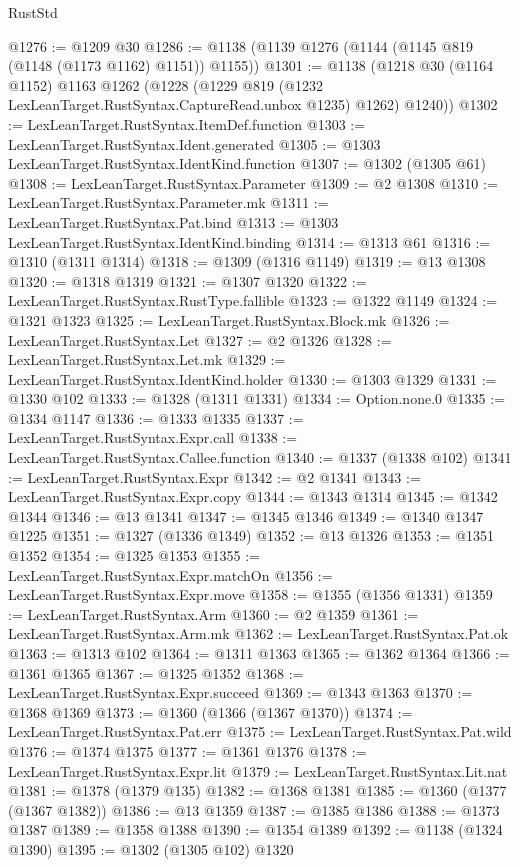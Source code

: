 \begin{lexlean}{RustStd}
\begin{coremodule}
@1276 := @1209 @30
@1286 := @1138 (@1139 @1276 (@1144 (@1145 @819 (@1148 (@1173 @1162) @1151)) @1155))
@1301 := @1138
    (@1218
      @30
      (@1164 @1152)
      @1163
      @1262
      (@1228 (@1229 @819 (@1232 LexLeanTarget.RustSyntax.CaptureRead.unbox @1235) @1262) @1240))
@1302 := LexLeanTarget.RustSyntax.ItemDef.function
@1303 := LexLeanTarget.RustSyntax.Ident.generated
@1305 := @1303 LexLeanTarget.RustSyntax.IdentKind.function
@1307 := @1302 (@1305 @61)
@1308 := LexLeanTarget.RustSyntax.Parameter
@1309 := @2 @1308
@1310 := LexLeanTarget.RustSyntax.Parameter.mk
@1311 := LexLeanTarget.RustSyntax.Pat.bind
@1313 := @1303 LexLeanTarget.RustSyntax.IdentKind.binding
@1314 := @1313 @61
@1316 := @1310 (@1311 @1314)
@1318 := @1309 (@1316 @1149)
@1319 := @13 @1308
@1320 := @1318 @1319
@1321 := @1307 @1320
@1322 := LexLeanTarget.RustSyntax.RustType.fallible
@1323 := @1322 @1149
@1324 := @1321 @1323
@1325 := LexLeanTarget.RustSyntax.Block.mk
@1326 := LexLeanTarget.RustSyntax.Let
@1327 := @2 @1326
@1328 := LexLeanTarget.RustSyntax.Let.mk
@1329 := LexLeanTarget.RustSyntax.IdentKind.holder
@1330 := @1303 @1329
@1331 := @1330 @102
@1333 := @1328 (@1311 @1331)
@1334 := Option.none.{0}
@1335 := @1334 @1147
@1336 := @1333 @1335
@1337 := LexLeanTarget.RustSyntax.Expr.call
@1338 := LexLeanTarget.RustSyntax.Callee.function
@1340 := @1337 (@1338 @102)
@1341 := LexLeanTarget.RustSyntax.Expr
@1342 := @2 @1341
@1343 := LexLeanTarget.RustSyntax.Expr.copy
@1344 := @1343 @1314
@1345 := @1342 @1344
@1346 := @13 @1341
@1347 := @1345 @1346
@1349 := @1340 @1347 @1225
@1351 := @1327 (@1336 @1349)
@1352 := @13 @1326
@1353 := @1351 @1352
@1354 := @1325 @1353
@1355 := LexLeanTarget.RustSyntax.Expr.matchOn
@1356 := LexLeanTarget.RustSyntax.Expr.move
@1358 := @1355 (@1356 @1331)
@1359 := LexLeanTarget.RustSyntax.Arm
@1360 := @2 @1359
@1361 := LexLeanTarget.RustSyntax.Arm.mk
@1362 := LexLeanTarget.RustSyntax.Pat.ok
@1363 := @1313 @102
@1364 := @1311 @1363
@1365 := @1362 @1364
@1366 := @1361 @1365
@1367 := @1325 @1352
@1368 := LexLeanTarget.RustSyntax.Expr.succeed
@1369 := @1343 @1363
@1370 := @1368 @1369
@1373 := @1360 (@1366 (@1367 @1370))
@1374 := LexLeanTarget.RustSyntax.Pat.err
@1375 := LexLeanTarget.RustSyntax.Pat.wild
@1376 := @1374 @1375
@1377 := @1361 @1376
@1378 := LexLeanTarget.RustSyntax.Expr.lit
@1379 := LexLeanTarget.RustSyntax.Lit.nat
@1381 := @1378 (@1379 @135)
@1382 := @1368 @1381
@1385 := @1360 (@1377 (@1367 @1382))
@1386 := @13 @1359
@1387 := @1385 @1386
@1388 := @1373 @1387
@1389 := @1358 @1388
@1390 := @1354 @1389
@1392 := @1138 (@1324 @1390)
@1395 := @1302 (@1305 @102) @1320

\end{coremodule}
\end{lexlean}
